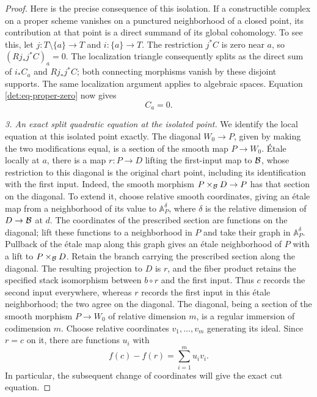 \begin{proof}
Here is the precise consequence of this isolation.  If a constructible
complex on a proper scheme vanishes on a punctured neighborhood of a
closed point, its contribution at that point is a direct summand of its
global cohomology.  To see this, let $j:T\setminus\{a\}\to T$ and
$i:\{a\}\to T$.  The restriction $j^*C$ is zero near $a$, so
$(Rj_*j^*C)_a=0$.  The localization triangle consequently splits as the
direct sum of $i_*C_a$ and $Rj_*j^*C$; both connecting morphisms vanish
by these disjoint supports.  The same localization argument applies
to algebraic spaces.  Equation
\eqref{det:eq-proper-zero} now gives
\begin{equation}\label{det:eq-vertex-zero}
                                  C_a=0.
\end{equation}

\smallskip\noindent
\emph{3. An exact split quadratic equation at the isolated point.}
We identify the local equation at this isolated point exactly.  The
diagonal $W_0\to P$, given by making the two modifications equal, is a
section of the smooth map $P\to W_0$.  \'Etale locally at $a$, there is a
map $r:P\to D$ lifting the first-input map to $\mathcal B$, whose restriction
to this diagonal is the original chart point, including its
identification with the first input.  Indeed, the smooth morphism
$P\times_{\mathcal B}D\to P$ has that section on the diagonal.  To extend it,
choose relative smooth coordinates, giving an \'etale map from a
neighborhood of its value to $\mathbb A^\delta_P$, where $\delta$ is
the relative dimension of $D\to\mathcal B$ at $d$.  The coordinates of the
prescribed section are functions on the diagonal; lift these functions
to a neighborhood in $P$ and take their graph in $\mathbb A^\delta_P$.
Pullback of the \'etale map along this graph gives an \'etale neighborhood
of $P$ with a lift to $P\times_{\mathcal B}D$.  Retain the branch carrying
the prescribed section along the diagonal.  The resulting projection
to $D$ is $r$, and the fiber product retains the specified stack
isomorphism between $b\circ r$ and the first input.
Thus $c$ records the second input everywhere, whereas $r$ records the
first input in this \'etale neighborhood; the two agree on the diagonal.
The diagonal, being a section of the smooth morphism $P\to W_0$ of
relative dimension $m$, is a regular immersion of codimension $m$.
Choose relative coordinates $v_1,\ldots,v_m$ generating its ideal.
Since $r=c$ on it, there are functions $u_i$ with
\begin{equation}\label{det:eq-exact-uv}
                         f(c)-f(r)=\sum_{i=1}^m u_i v_i.
\end{equation}
In particular, the subsequent change of coordinates will give the exact
cut equation.


\end{proof}

